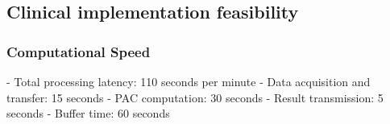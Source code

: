 
\subsection{Clinical implementation feasibility}
\subsubsection{Computational Speed}
   - Total processing latency: 110 seconds per minute
     - Data acquisition and transfer: 15 seconds
     - PAC computation: 30 seconds
     - Result transmission: 5 seconds
     - Buffer time: 60 seconds




\label{sec:discussion}

